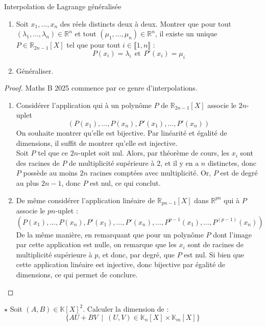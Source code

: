 \documentclass[french,a4paper]{article}
\newcommand{\R}{\mathbb{R}}
\newcommand{\K}{\mathbb{K}}
\theoremstyle{plain}
\theoremstyle{definition}
\theoremstyle{remark}
\begin{document}
\begin{ex}[Moulin.EV.44]{Interpolation de Lagrange généralisée}
	\begin{enumerate}
		\item Soit $x_1,\ldots,x_n$ des réels distincts deux à deux. Montrer que pour tout $(\lambda_1,\ldots,\lambda_n)\in\R^n$ et tout $(\mu_1,\ldots,\mu_n)\in\R^n$, il existe un unique $P\in\R_{2n-1}[X]$ tel que pour tout $i\in\llbracket1,n\rrbracket$ : $$P(x_i)=\lambda_i\ \ \text{et}\ \ P'(x_i)=\mu_i$$
		\item Généraliser. 
	\end{enumerate}
\end{ex}
\begin{proof}
	Maths B 2025 commence par ce genre d'interpolations.
	\begin{enumerate}
		\item Considérer l'application qui à un polynôme $P$ de $\R_{2n-1}[X]$ associe le $2n$-uplet $$(P(x_1),\ldots,P(x_n),P'(x_1),\ldots,P'(x_n))$$ On souhaite montrer qu'elle est bijective. Par linéarité et égalité de dimensions, il suffit de montrer qu'elle est injective. \\
		Soit $P$ tel que ce $2n$-uplet soit nul. Alors, par théorème de cours, les $x_i$ sont des racines de $P$ de multiplicité supérieure à $2$, et il y en a $n$ distinctes, donc $P$ possède au moins $2n$ racines comptées avec multiplicité. Or, $P$ est de degré au plus $2n-1$, donc $P$ est nul, ce qui conclut.
		\item De même considérer l'application linéaire de $\R_{pn-1}[X]$ dans $\R^{pn}$ qui à $P$ associe le $pn$-uplet : $$(P(x_1),\ldots,P(x_n),P'(x_1),\ldots,P'(x_n),\ldots,P^{p-1}(x_1),\ldots,P^{(p-1)}(x_n))$$ De la même manière, en remarquant que pour un polynôme $P$ dont l'image par cette application est nulle, on remarque que les $x_i$ sont de racines de multiplicité supérieure à $p$, et donc, par degré, que $P$ est nul. Si bien que cette application linéaire est injective, donc bijective par égalité de dimensions, ce qui permet de conclure.
	\end{enumerate}
\end{proof}

\begin{ex}[Moulin.EV.45]{$\star$}
	Soit $(A,B)\in\K[X]^2$. Calculer la dimension de : $$\{AU+BV\ \mid\ (U,V)\in\K_n[X]\times\K_m[X]\}$$
\end{ex}
\end{document}

